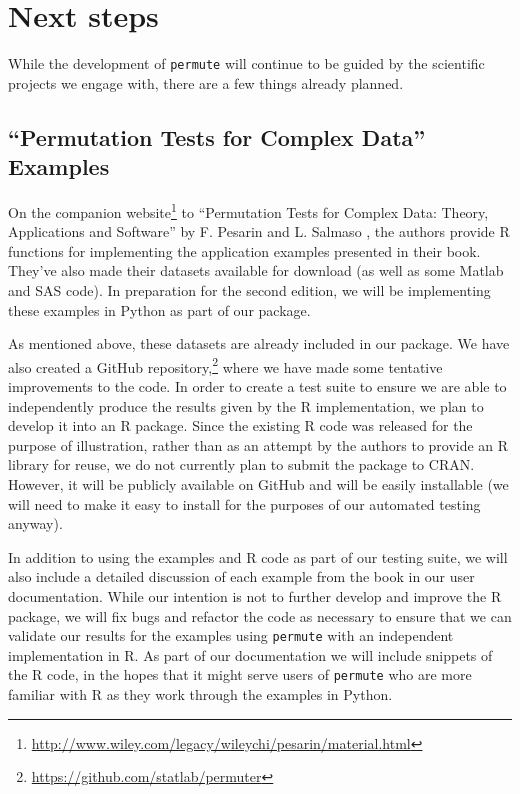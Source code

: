 \chapter{\label{ch:nextsteps}Next steps}

While the development of \texttt{permute} will continue to be guided by the
scientific projects we engage with, there are a few things already planned.

\section{\label{sec:book}``Permutation Tests for Complex Data'' Examples}

On the companion
website\footnote{\url{http://www.wiley.com/legacy/wileychi/pesarin/material.html}}
to ``Permutation Tests for Complex Data: Theory, Applications and
Software'' by F. Pesarin and L. Salmaso \cite{pesarin2010permutation}, the
authors provide R functions for implementing the application examples
presented in their book.  They've also made their datasets available for download
(as well as some Matlab and SAS code).  In preparation for the second edition,
we will be implementing these examples in Python as part of our package.

As mentioned above, these datasets are already included in our package.  We have
also created a GitHub
repository,\footnote{\url{https://github.com/statlab/permuter}} where we have
made some tentative improvements to the code.  In order to create a test suite
to ensure we are able to independently produce the results given by the R
implementation, we plan to develop it into an R package.  Since the existing R
code was released for the purpose of illustration, rather than as an attempt by
the authors to provide an R library for reuse, we do not currently plan to
submit the package to CRAN.  However, it will be publicly available on GitHub
and will be easily installable (we will need to make it easy to install for the
purposes of our automated testing anyway).

In addition to using the examples and R code as part of our testing suite, we
will also include a detailed discussion of each example from the book in our
user documentation.  While our intention is not to further develop and improve
the R package, we will fix bugs and refactor the code as necessary to ensure
that we can validate our results for the examples using \texttt{permute} with
an independent implementation in R.  As part of our documentation we will
include snippets of the R code, in the hopes that it might serve users of
\texttt{permute} who are more familiar with R as they work through the examples
in Python.


